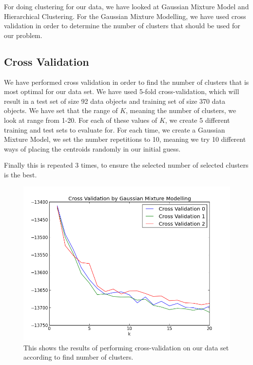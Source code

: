 For doing clustering for our data, we have looked at Gaussian Mixture Model and Hierarchical Clustering. For the Gaussian Mixture Modelling, we have used cross validation in order to determine the number of clusters that should be used for our problem.


\subsection{Cross Validation}

We have performed cross validation in order to find the number of clusters that is most optimal for our data set. We have used 5-fold cross-validation, which will result in a test set of size 92 data objects and training set of size 370 data objects. We have set that the range of $K$, meaning the number of clusters, we look at range from 1-20. For each of these values of $K$, we create 5 different training and test sets to evaluate for. For each time, we create a Gaussian Mixture Model, we set the number repetitions to 10, meaning we try 10 different ways of placing the centroids randomly in our initial guess.

Finally this is repeated 3 times, to ensure the selected number of selected clusters is the best.

\begin{figure}[H]
\center
\includegraphics[scale=0.5]{pictures/CVKGaussian.png}
\caption{\footnotesize This shows the results of performing cross-validation on our data set according to find number of clusters.}
\label{CVK}
\end{figure}

